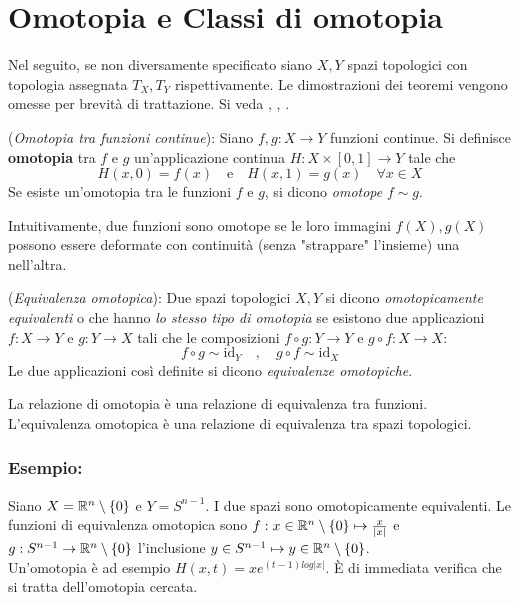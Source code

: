 \section{Omotopia e Classi di omotopia}
Nel seguito, se non diversamente specificato siano $X,Y$ spazi topologici con
topologia assegnata $T_X , T_Y$ rispettivamente.
Le dimostrazioni dei teoremi vengono omesse per brevità di trattazione. Si veda
\cite{sernesi}, \cite{fulton}, \cite{nakahara}.

\begin{definition}(\emph{Omotopia tra funzioni continue}):
   Siano $f,g : X \to Y$ funzioni continue. Si definisce \textbf{omotopia} tra
   $f$ e $g$ un'applicazione continua $H : X \times [0,1] \to Y$ tale che
   $$ H(x,0) = f(x) \quad \mathrm{e} \quad H(x,1) = g(x) \quad \forall x \in X$$
   Se esiste un'omotopia tra le funzioni $f$ e $g$, si dicono \emph{omotope} $f \sim g$.
   \label{def:omotopia}
\end{definition}

Intuitivamente, due funzioni sono omotope se le loro immagini $f(X),g(X)$ possono essere
deformate con continuità (senza "strappare" l'insieme) una nell'altra.

\begin{definition}(\emph{Equivalenza omotopica}):
   Due spazi topologici $X,Y$ si dicono \emph{omotopicamente equivalenti} o che hanno
   \emph{lo stesso tipo di omotopia} se esistono due applicazioni $f : X \to Y$ e
   $g : Y \to X$ tali che le composizioni $f \circ g : Y \to Y$ e
   $g \circ f : X \to X$:
      $$  f \circ g \sim \mathrm{id}_Y \quad , \quad g \circ f \sim \mathrm{id}_X $$
   Le due applicazioni così definite si dicono \emph{equivalenze omotopiche}.
\end{definition}

\begin{lemma}
   La relazione di omotopia è una relazione di equivalenza tra funzioni.
   L'equivalenza omotopica è una relazione di equivalenza tra spazi topologici.
\end{lemma}

\subsubsection{Esempio:}
\begin{example}
   Siano $X = \mathbb{R}^n\setminus\{0\}$ e $Y = S^{n-1}$. I due spazi sono
   omotopicamente equivalenti. Le funzioni di equivalenza omotopica sono
   $f : x \in \mathbb{R}^n\setminus\{0\} \mapsto \frac{x}{|x|}$ e
   $g : S^{n-1} \to \mathbb{R}^n\setminus\{0\}$ l'inclusione
   $y \in S^{n-1} \mapsto y \in \mathbb{R}^n\setminus\{0\}$. \\
   Un'omotopia è ad esempio $H(x,t) = x e^{(t-1)log|x|}$. È di immediata verifica
   che si tratta dell'omotopia cercata.
\end{example}

